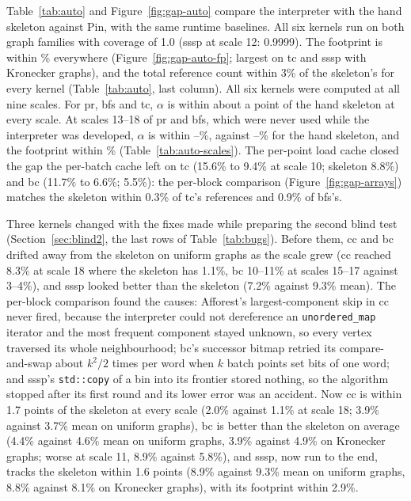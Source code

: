\documentclass[11pt]{article}
\newcommand{\code}[1]{\texttt{#1}}
\newcommand{\secref}[1]{Section~\ref{#1}}
\newcommand{\figref}[1]{Figure~\ref{#1}}
\newcommand{\tabref}[1]{Table~\ref{#1}}
\begin{document}
\tabref{tab:auto} and \figref{fig:gap-auto} compare the interpreter with the hand skeleton against Pin, with the same
runtime baselines. All six kernels run on both graph families with coverage of 1.0 (sssp at scale 12: 0.9999).
The footprint is within \numautoFpMax\% everywhere (\figref{fig:gap-auto-fp}; largest on tc and sssp with Kronecker
graphs), and the total reference count within 3\% of the skeleton's for every kernel (\tabref{tab:auto}, last
column). All six kernels were computed at all
nine scales. For pr, bfs and tc, $\alpha$ is within about a point of the hand skeleton at every scale. At scales
13--18 of pr and bfs, which were never used while the interpreter was developed, $\alpha$ is within
\numbigAutoAlphaMin--\numbigAutoAlphaMax\%, against \numbigHandAlphaMin--\numbigHandAlphaMax\% for the hand
skeleton, and the footprint within \numbigAutoFpMax\% (\tabref{tab:auto-scales}). The per-point load cache closed the
gap the per-batch cache left on tc (15.6\% to 9.4\% at scale 10; skeleton 8.8\%) and bc (11.7\% to 6.6\%; 5.5\%):
the per-block comparison (\figref{fig:gap-arrays}) matches the skeleton within 0.3\% of tc's references and 0.9\%
of bfs's.

Three kernels changed with the fixes made while preparing the second blind test (\secref{sec:blind2}, the last
rows of \tabref{tab:bugs}). Before them, cc and bc drifted away from the skeleton on uniform graphs as the scale grew
(cc reached 8.3\% at scale 18 where the skeleton has 1.1\%, bc 10--11\% at scales 15--17 against 3--4\%), and sssp looked
better than the skeleton (7.2\% against 9.3\% mean). The per-block comparison found the causes: Afforest's
largest-component skip in cc never fired, because the interpreter could not dereference an \code{unordered\_map}
iterator and the most frequent component stayed unknown, so every vertex traversed its whole neighbourhood; bc's
successor bitmap retried its compare-and-swap about $k^2/2$ times per word when $k$ batch points set bits of one word;
and sssp's \code{std::copy} of a bin into its frontier stored nothing, so the algorithm stopped after its first round
and its lower error was an accident. Now cc is within 1.7 points of the skeleton at every scale (2.0\% against
1.1\% at scale 18; 3.9\% against 3.7\% mean on uniform graphs), bc is better than the skeleton on average (4.4\%
against 4.6\% mean on uniform graphs, 3.9\% against 4.9\% on Kronecker graphs; worse at scale 11, 8.9\% against
5.8\%), and sssp, now run to the end, tracks the skeleton within 1.6 points (8.9\% against 9.3\% mean on uniform
graphs, 8.8\% against 8.1\% on Kronecker graphs), with its footprint within 2.9\%.
\end{document}
